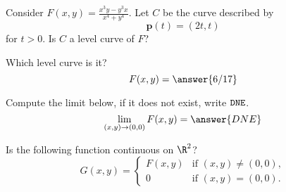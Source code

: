 \documentclass{ximera}
\author{Jim Talamo \and Bart Snapp}
\newcommand{\point}[1]{\left(#1\right)} %
\newcommand{\pt}[1]{\mathbf{#1}} %
\begin{document}
\begin{exercise}
  Consider $F(x,y) = \frac{x^3 y - y^3 x}{x^4+y^4}$. Let $C$ be the
  curve described by
  \[
  \pt{p}(t) = \point{2t,t}
  \]
  for $t> 0$. Is $C$ a level curve of $F$?
  \begin{multipleChoice}
  \end{multipleChoice}
  \begin{exercise}
    Which level curve is it?
    \[
    F(x,y) = \answer{6/17}
    \]
  \end{exercise}
  \begin{exercise}
    Compute the limit below, if it does not exist, write $\verb|DNE|$.
    \[
    \lim_{\point{x,y}\to \point{0,0}} F(x,y) = \answer{DNE}
    \]
  \end{exercise}
  \begin{exercise}
    Is the following function continuous on $\R^2$?
    \[
    G(x,y) =
    \begin{cases}
      F(x,y) &\text{if $(x,y)\ne (0,0)$},\\
      0 &\text{if $(x,y) = (0,0)$}.
    \end{cases}
    \]
    \begin{multipleChoice}
    \end{multipleChoice}
  \end{exercise}
\end{exercise}
\end{document}
